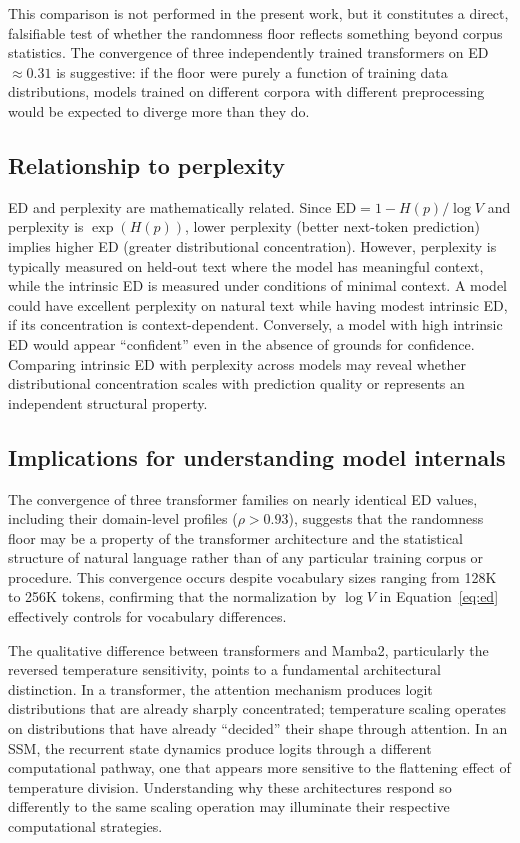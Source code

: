 \documentclass{article}
\newcommand{\ED}{\mathrm{ED}}
\begin{document}
This comparison is not performed in the present work, but it constitutes a direct, falsifiable test of whether the randomness floor reflects something beyond corpus statistics. The convergence of three independently trained transformers on ED $\approx 0.31$ is suggestive: if the floor were purely a function of training data distributions, models trained on different corpora with different preprocessing would be expected to diverge more than they do.

\subsection{Relationship to perplexity}

ED and perplexity are mathematically related. Since $\ED = 1 - H(p) / \log V$ and perplexity is $\exp(H(p))$, lower perplexity (better next-token prediction) implies higher ED (greater distributional concentration). However, perplexity is typically measured on held-out text where the model has meaningful context, while the intrinsic ED is measured under conditions of minimal context. A model could have excellent perplexity on natural text while having modest intrinsic ED, if its concentration is context-dependent. Conversely, a model with high intrinsic ED would appear ``confident'' even in the absence of grounds for confidence. Comparing intrinsic ED with perplexity across models may reveal whether distributional concentration scales with prediction quality or represents an independent structural property.

\subsection{Implications for understanding model internals}

The convergence of three transformer families on nearly identical ED values, including their domain-level profiles ($\rho > 0.93$), suggests that the randomness floor may be a property of the transformer architecture and the statistical structure of natural language rather than of any particular training corpus or procedure. This convergence occurs despite vocabulary sizes ranging from 128K to 256K tokens, confirming that the normalization by $\log V$ in Equation~\ref{eq:ed} effectively controls for vocabulary differences.

The qualitative difference between transformers and Mamba2, particularly the reversed temperature sensitivity, points to a fundamental architectural distinction. In a transformer, the attention mechanism produces logit distributions that are already sharply concentrated; temperature scaling operates on distributions that have already ``decided'' their shape through attention. In an SSM, the recurrent state dynamics produce logits through a different computational pathway, one that appears more sensitive to the flattening effect of temperature division. Understanding why these architectures respond so differently to the same scaling operation may illuminate their respective computational strategies.
\end{document}
